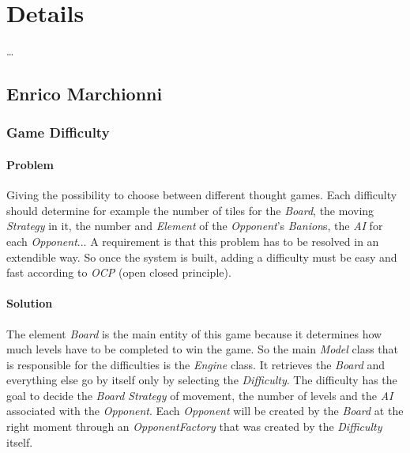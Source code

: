 \documentclass[12pt, a4paper]{report}
\begin{document}

\section{Details}

    \dots

    \subsection*{Enrico Marchionni}

        \subsubsection{Game Difficulty}

            \paragraph{Problem}
            
            Giving the possibility to choose between different thought games.
            Each difficulty should determine for example the number of tiles for the \emph{Board}, the moving \emph{Strategy} in it,
            the number and \emph{Element} of the \emph{Opponent}'s \emph{Banion}s, the \emph{AI} for each \emph{Opponent}...
            A requirement is that this problem has to be resolved in an extendible way.
            So once the system is built, adding a difficulty must be easy and fast according to \emph{OCP} (open closed principle).

            \paragraph{Solution}

            The element \emph{Board} is the main entity of this game because it determines how much
            levels have to be completed to win the game. So the main \emph{Model} class that is responsible for
            the difficulties is the \emph{Engine} class. It retrieves the \emph{Board} and everything else go by itself
            only by selecting the \emph{Difficulty}. The difficulty has the goal to decide the \emph{Board} \emph{Strategy} of
            movement, the number of levels and the \emph{AI} associated with the \emph{Opponent}. Each \emph{Opponent} will
            be created by the \emph{Board} at the right moment through an \emph{OpponentFactory} that was created by the \emph{Difficulty}
            itself.
\end{document}
